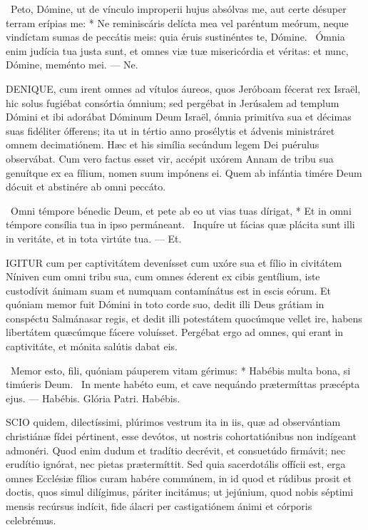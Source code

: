 \R\ Peto, Dómine, ut de vínculo improperii hujus absólvas me, aut certe désuper terram erípias me: * Ne reminiscáris delícta mea vel paréntum meórum, neque vindíctam sumas de peccátis meis: quia éruis sustinéntes te, Dómine. \V\ Ómnia enim judícia tua justa sunt, et omnes viæ tuæ misericórdia et véritas: et nunc, Dómine, meménto mei. — Ne.


\lettrine[lines=2]{D}{ENIQUE}, cum irent omnes ad vítulos áureos, quos Jeróboam fécerat rex Israël, hic solus fugiébat consórtia ómnium; sed pergébat in Jerúsalem ad templum Dómini et ibi adorábat Dóminum Deum Israël, ómnia primitíva sua et décimas suas fidéliter ófferens; ita ut in tértio anno prosélytis et ádvenis ministráret omnem decimatiónem. Hæc et his simília secúndum legem Dei puérulus observábat. Cum vero factus esset vir, accépit uxórem Annam de tribu sua genuítque ex ea fílium, nomen suum impónens ei. Quem ab infántia timére Deum dócuit et abstinére ab omni peccáto.

\R\ Omni témpore bénedic Deum, et pete ab eo ut vias tuas dírigat, * Et in omni témpore consília tua in ipso permáneant. \V\ Inquíre ut fácias quæ plácita sunt illi in veritáte, et in tota virtúte tua. — Et.


\lettrine[lines=2]{I}{GITUR} cum per captivitátem devenísset cum uxóre sua et fílio in civitátem Níniven cum omni tribu sua, cum omnes éderent ex cibis gentílium, iste custodívit ánimam suam et numquam contamínátus est in escis eórum. Et quóniam memor fuit Dómini in toto corde suo, dedit illi Deus grátiam in conspéctu Salmánasar regis, et dedit illi potestátem quocúmque vellet ire, habens libertátem quæcúmque fácere voluísset. Pergébat ergo ad omnes, qui erant in captivitáte, et mónita salútis dabat eis.

\R\ Memor esto, fili, quóniam páuperem vitam gérimus: * Habébis multa bona, si timúeris Deum. \V\ In mente habéto eum, et cave nequándo prætermíttas præcépta ejus. — Habébis. Glória Patri. Habébis.





\lettrine[lines=2]{S}{CIO} quidem, dilectíssimi, plúrimos vestrum ita in iis, quæ ad observántiam christiánæ fídei pértinent, esse devótos, ut nostris cohortatiónibus non indígeant admonéri. Quod enim dudum et tradítio decrévit, et consuetúdo firmávit; nec erudítio ignórat, nec pietas prætermíttit. Sed quia sacerdotális offícii est, erga omnes Ecclésiæ fílios curam habére commúnem, in id quod et rúdibus prosit et doctis, quos simul dilígimus, páriter incitámus; ut jejúnium, quod nobis séptimi mensis recúrsus indícit, fide álacri per castigatiónem ánimi et córporis celebrémus.

